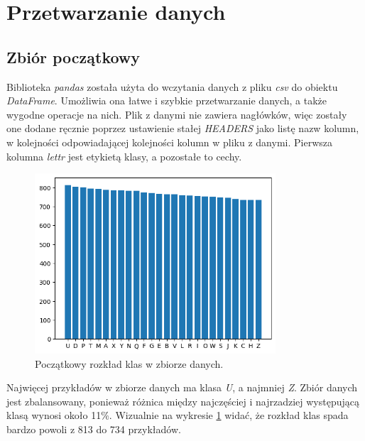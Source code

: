 \section{Przetwarzanie danych}\label{sec:przetwarzanie_danych}
\subsection{Zbiór początkowy}\label{subsec:zbior_poczatkowy}
Biblioteka \textit{pandas}\cite{mckinney-proc-scipy-2010} została użyta do wczytania danych z pliku \textit{csv} do obiektu \textit{DataFrame}.
Umożliwia ona łatwe i szybkie przetwarzanie danych, a także wygodne operacje na nich. Plik z danymi nie zawiera nagłówków, więc zostały one dodane ręcznie
poprzez ustawienie stałej \textit{HEADERS} jako listę nazw kolumn, w kolejności odpowiadającej kolejności kolumn w pliku z danymi.
Pierwsza kolumna \textit{lettr} jest etykietą klasy, a pozostałe to cechy.
\begin{figure}[H]
    \centering
    \includegraphics[width=0.8\textwidth]{img/bar_letter_count_initial.png}
    \caption{Początkowy rozkład klas w zbiorze danych.}
    \label{fig:bar_letter_count_initial}
\end{figure}
Najwięcej przykładów w zbiorze danych ma klasa \textit{U}, a najmniej \textit{Z}. 
Zbiór danych jest zbalansowany, ponieważ różnica między najczęściej i najrzadziej występującą klasą wynosi około 11\%.
Wizualnie na wykresie \ref{fig:bar_letter_count_initial} widać, że rozkład klas spada bardzo powoli z 813 do 734 przykładów.
